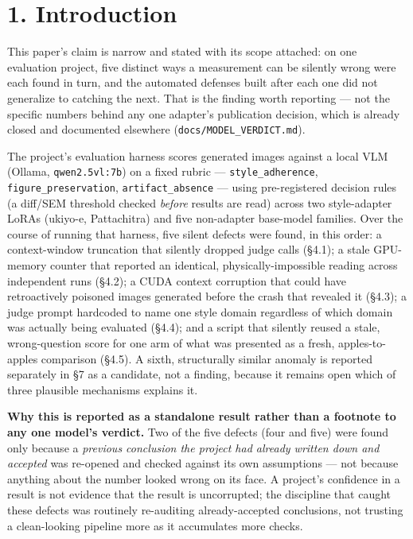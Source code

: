\hypertarget{introduction}{%
\section{1. Introduction}\label{introduction}}

This paper's claim is narrow and stated with its scope attached: on one
evaluation project, five distinct ways a measurement can be silently
wrong were each found in turn, and the automated defenses built after
each one did not generalize to catching the next. That is the finding
worth reporting --- not the specific numbers behind any one adapter's
publication decision, which is already closed and documented elsewhere
(\texttt{docs/MODEL\_VERDICT.md}).

The project's evaluation harness scores generated images against a local
VLM (Ollama, \texttt{qwen2.5vl:7b}) on a fixed rubric ---
\texttt{style\_adherence}, \texttt{figure\_preservation},
\texttt{artifact\_absence} --- using pre-registered decision rules (a
diff/SEM threshold checked \emph{before} results are read) across two
style-adapter LoRAs (ukiyo-e, Pattachitra) and five non-adapter
base-model families. Over the course of running that harness, five
silent defects were found, in this order: a context-window truncation
that silently dropped judge calls (§4.1); a stale GPU-memory counter
that reported an identical, physically-impossible reading across
independent runs (§4.2); a CUDA context corruption that could have
retroactively poisoned images generated before the crash that revealed
it (§4.3); a judge prompt hardcoded to name one style domain regardless
of which domain was actually being evaluated (§4.4); and a script that
silently reused a stale, wrong-question score for one arm of what was
presented as a fresh, apples-to-apples comparison (§4.5). A sixth,
structurally similar anomaly is reported separately in §7 as a
candidate, not a finding, because it remains open which of three
plausible mechanisms explains it.

\textbf{Why this is reported as a standalone result rather than a
footnote to any one model's verdict.} Two of the five defects (four and
five) were found only because a \emph{previous conclusion the project
had already written down and accepted} was re-opened and checked against
its own assumptions --- not because anything about the number looked
wrong on its face. A project's confidence in a result is not evidence
that the result is uncorrupted; the discipline that caught these defects
was routinely re-auditing already-accepted conclusions, not trusting a
clean-looking pipeline more as it accumulates more checks.

